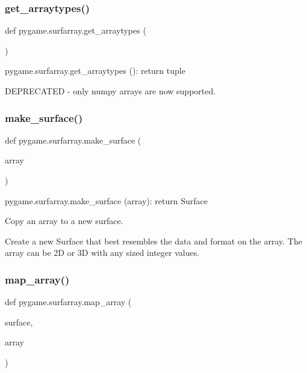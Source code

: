 \subsubsection{\texorpdfstring{get\+\_\+arraytypes()}{get\_arraytypes()}}
{\footnotesize\ttfamily def pygame.\+surfarray.\+get\+\_\+arraytypes (\begin{DoxyParamCaption}{ }\end{DoxyParamCaption})}

\begin{DoxyVerb}pygame.surfarray.get_arraytypes (): return tuple

DEPRECATED - only numpy arrays are now supported.
\end{DoxyVerb}
 \mbox{\label{namespacepygame_1_1surfarray_a2e4d5099d42534776fd74076d289b250}} 
\subsubsection{\texorpdfstring{make\+\_\+surface()}{make\_surface()}}
{\footnotesize\ttfamily def pygame.\+surfarray.\+make\+\_\+surface (\begin{DoxyParamCaption}\item[{}]{array }\end{DoxyParamCaption})}

\begin{DoxyVerb}pygame.surfarray.make_surface (array): return Surface

Copy an array to a new surface.

Create a new Surface that best resembles the data and format on the
array. The array can be 2D or 3D with any sized integer values.
\end{DoxyVerb}
 \mbox{\label{namespacepygame_1_1surfarray_a8cd10e198513c74ce0100735dc7408a8}} 
\subsubsection{\texorpdfstring{map\+\_\+array()}{map\_array()}}
{\footnotesize\ttfamily def pygame.\+surfarray.\+map\+\_\+array (\begin{DoxyParamCaption}\item[{}]{surface,  }\item[{}]{array }\end{DoxyParamCaption})}

